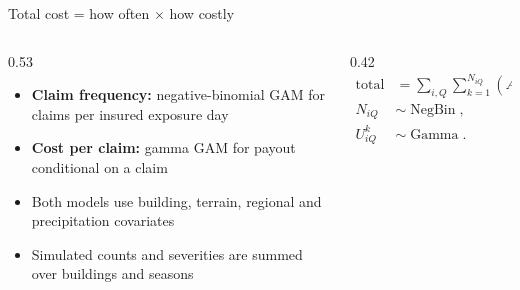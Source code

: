 \begin{frame}{Total cost = how often $\times$ how costly}
  \begin{columns}[T,onlytextwidth]
    \begin{column}{0.53\textwidth}
      \begin{itemize}
        \item \textbf{Claim frequency:} negative-binomial GAM for
          claims per insured exposure day
        \item \textbf{Cost per claim:} gamma GAM for payout
          conditional on a claim
        \item Both models use building, terrain, regional and
          precipitation covariates
        \item Simulated counts and severities are summed over
          buildings and seasons
      \end{itemize}
    \end{column}
    \begin{column}{0.42\textwidth}
      \vspace{0.7cm}
      \begin{align*}
        \text{total cost}
        &= \sum_{i,Q}\sum_{k=1}^{N_{iQ}}
        \left(A_i + U_{iQ}^{k}\right),\\[0.4cm]
        N_{iQ} &\sim \operatorname{NegBin},\\
        U_{iQ}^{k} &\sim \operatorname{Gamma}.
      \end{align*}
    \end{column}
  \end{columns}
\end{frame}

